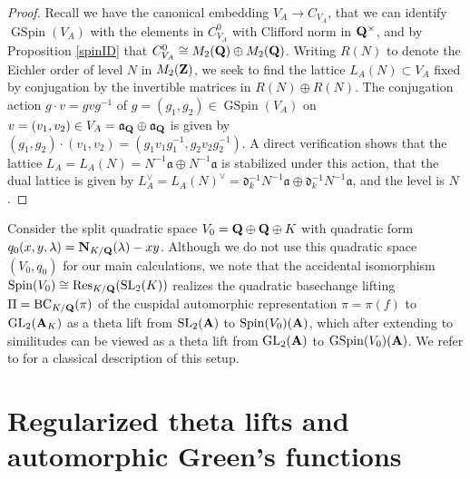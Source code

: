 \documentclass{amsart}
\theoremstyle{definition}
\newenvironment{remark}[1][Remark]{\begin{trivlist}
\item[\hskip \labelsep {\bfseries #1}]}{\end{trivlist}}
\begin{document}
\begin{proof} 

Recall we have the canonical embedding $V_A \rightarrow C_{V_A}$, that we can identify 
$\operatorname{GSpin}(V_A)$ with the elements in $C_{V_A}^0$ with Clifford norm in ${\bf{Q}}^{\times}$,
and by Proposition \ref{spinID} that $C_{V_A}^0 \cong M_2({\bf{Q}}) \oplus M_2({\bf{Q}})$. 
Writing $R(N)$ to denote the Eichler order of level $N$ in $M_2({\bf{Z}})$, 
we seek to find the lattice $L_A(N) \subset V_A$ fixed by conjugation by the invertible matrices in $R(N) \oplus R(N)$. 
The conjugation action $g \cdot v = g v g^{-1}$ of $g = (g_1, g_2) \in \operatorname{GSpin}(V_A)$
on $v = (v_1, v_2) \in V_A = \mathfrak{a}_{\bf{Q}} \oplus \mathfrak{a}_{\bf{Q}}$ is given by 
$(g_1, g_2) \cdot (v_1, v_2) = (g_1 v_1 g_1^{-1}, g_2 v_2 g_2^{-1}).$ 
A direct verification shows that the lattice $L_A = L_A(N) = N^{-1} \mathfrak{a} \oplus N^{-1} \mathfrak{a}$ is stabilized under this action,
that the dual lattice is given by $L_A^{\vee} = L_A(N)^{\vee} = \mathfrak{d}_k^{-1} N^{-1} \mathfrak{a} \oplus \mathfrak{d}_k^{-1} N^{-1} \mathfrak{a}$, and the level is $N$. \end{proof}

\begin{remark}[Relation to quadratic basechange liftings.] 

Consider the split quadratic space $V_0 = {\bf{Q}} \oplus {\bf{Q}} \oplus K$ 
with quadratic form $q_0(x, y, \lambda) = {\bf{N}}_{K/{\bf{Q}}}(\lambda) - xy$.
Although we do not use this quadratic space $(V_0, q_0)$ for our main calculations, 
we note that the accidental isomorphism $\operatorname{Spin}(V_0) \cong \operatorname{Res}_{K/{\bf{Q}}}(\operatorname{SL}_2(K))$ 
realizes the quadratic basechange lifting $\Pi = \operatorname{BC}_{K/{\bf{Q}}}(\pi)$ of the cuspidal 
automorphic representation $\pi =\pi(f)$ to $\operatorname{GL}_2({\bf{A}}_K)$ as a theta lift from 
$\operatorname{SL}_2({\bf{A}})$ to $\operatorname{Spin}(V_0)({\bf{A}})$, which after extending to similitudes can 
be viewed as a theta lift from $\operatorname{GL}_2({\bf{A}})$ to $\operatorname{GSpin}(V_0)({\bf{A}})$. 
We refer to \cite[$\S$2-3]{Br} for a classical description of this setup. \end{remark}

\section{Regularized theta lifts and automorphic Green's functions}
\end{document}
